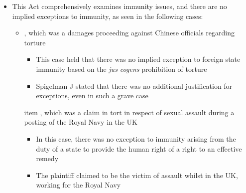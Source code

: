 \begin{itemize}
    \item This Act comprehensively examines immunity issues, and there are no implied exceptions to immunity, as seen in the following cases:
    \begin{itemize}
        \item {}, which was a damages proceeding against Chinese officials regarding torture
        \begin{itemize}
            \item This case held that there was no implied exception to foreign state immunity based on the \textit{jus cogens} prohibition of torture
            \item Spigelman J stated that there was no additional justification for exceptions, even in such a grave case
        \end{itemize}
        item , which was a claim in tort in respect of sexual assault during a posting of the Royal Navy in the UK
        \begin{itemize}
            \item In this case, there was no exception to immunity arising from the duty of a state to provide the human right of a right to an effective remedy
            \item The plaintiff claimed to be the victim of assault whilst in the UK, working for the Royal Navy
        \end{itemize}
    \end{itemize}
\end{itemize}

